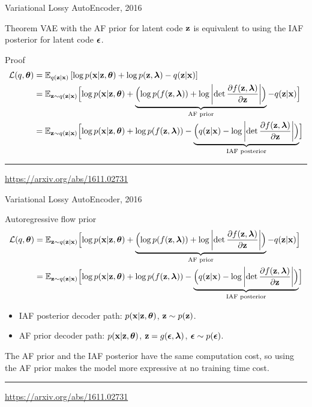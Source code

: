 \begin{frame}{Variational Lossy AutoEncoder, 2016}
\begin{block}{Theorem}
VAE with the AF prior for latent code $\mathbf{z}$ is equivalent to using the IAF posterior for latent code $\boldsymbol{\epsilon}$.
\end{block}
\begin{block}{Proof}
\vspace{-0.5cm}
{\footnotesize
\begin{align*}
\mathcal{L}(q, \boldsymbol{\theta}) &= \mathbb{E}_{q(\mathbf{z} | \mathbf{x})} \left[ \log p(\mathbf{x} | \mathbf{z}, \boldsymbol{\theta}) +  \log p(\mathbf{z}, \boldsymbol{\lambda}) - q(\mathbf{z} | \mathbf{x}) \right] \\
&= \mathbb{E}_{\mathbf{z} \sim q(\mathbf{z} | \mathbf{x})} \Bigl[ \log p(\mathbf{x} | \mathbf{z}, \boldsymbol{\theta}) + \underbrace{ \Bigl( \log p(f(\mathbf{z}, \boldsymbol{\lambda})) + \log \left| \det \frac{\partial f(\mathbf{z}, \boldsymbol{\lambda})}{\partial \mathbf{z}} \right| \Bigr) }_{\text{AF prior}} - q(\mathbf{z} | \mathbf{x}) \Bigr] \\
&= \mathbb{E}_{\mathbf{z} \sim q(\mathbf{z} | \mathbf{x})} \Bigl[ \log p(\mathbf{x} | \mathbf{z}, \boldsymbol{\theta}) +  \log p(f(\mathbf{z}, \boldsymbol{\lambda})) - \underbrace{ \Bigl( q(\mathbf{z} | \mathbf{x}) - \log \left| \det \frac{\partial f(\mathbf{z}, \boldsymbol{\lambda})}{\partial \mathbf{z}} \right| \Bigr) }_{\text{IAF posterior}} \Bigr]
\end{align*}
}
\end{block}
\vfill
\hrule\medskip
{\scriptsize \href{https://arxiv.org/abs/1611.02731}{https://arxiv.org/abs/1611.02731}}
\end{frame}
\begin{frame}{Variational Lossy AutoEncoder, 2016}
	\begin{block}{Autoregressive flow prior}
		{\footnotesize
		\begin{align*}
			\mathcal{L}(q, \boldsymbol{\theta}) &= \mathbb{E}_{\mathbf{z} \sim q(\mathbf{z} | \mathbf{x})} \Bigl[ \log p(\mathbf{x} | \mathbf{z}, \boldsymbol{\theta}) + \underbrace{ \Bigl( \log p(f(\mathbf{z}, \boldsymbol{\lambda})) + \log \left| \det \frac{\partial f(\mathbf{z}, \boldsymbol{\lambda})}{\partial \mathbf{z}} \right| \Bigr) }_{\text{AF prior}} - q(\mathbf{z} | \mathbf{x}) \Bigr] \\
			&= \mathbb{E}_{\mathbf{z} \sim q(\mathbf{z} | \mathbf{x})} \Bigl[ \log p(\mathbf{x} | \mathbf{z}, \boldsymbol{\theta}) +  \log p(f(\mathbf{z}, \boldsymbol{\lambda})) - \underbrace{ \Bigl( q(\mathbf{z} | \mathbf{x}) - \log \left| \det \frac{\partial f(\mathbf{z}, \boldsymbol{\lambda})}{\partial \mathbf{z}} \right| \Bigr) }_{\text{IAF posterior}} \Bigr]
		\end{align*}
		}
	\end{block}
	\begin{itemize}
		\item IAF posterior decoder path: $p(\mathbf{x}|\mathbf{z}, \boldsymbol{\theta})$, $\mathbf{z} \sim p(\mathbf{z})$.
		\item AF prior decoder path: $p(\mathbf{x}|\mathbf{z}, \boldsymbol{\theta})$, $\mathbf{z} = g(\boldsymbol{\epsilon}, \boldsymbol{\lambda})$, $\boldsymbol{\epsilon} \sim p(\boldsymbol{\epsilon})$. 
	\end{itemize}
	The AF prior and the IAF posterior have the same computation cost, so using the AF prior makes the model more expressive at no training time cost.
\vfill
\hrule\medskip
{\scriptsize \href{https://arxiv.org/abs/1611.02731}{https://arxiv.org/abs/1611.02731}}
\end{frame}
